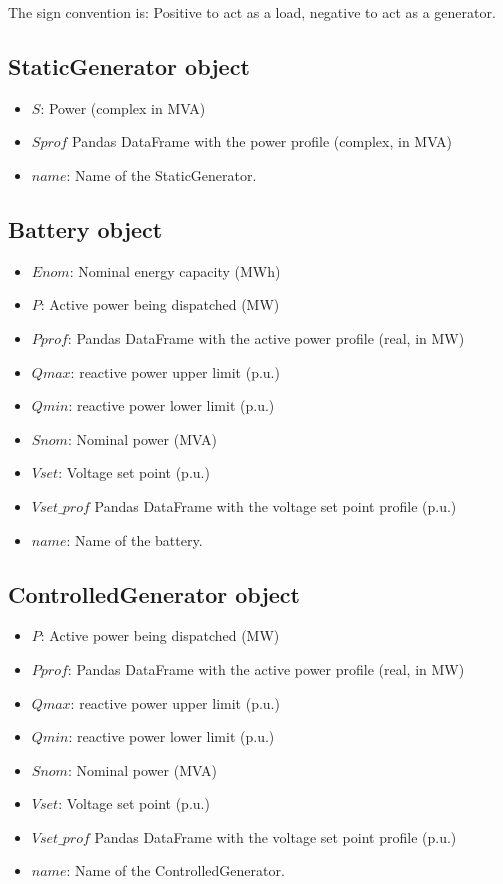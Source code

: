 \documentclass[11pt,fleqn]{book} %
\begin{document}
The sign convention is: Positive to act as a load, negative to act as a generator.

\subsection{StaticGenerator object}

\begin{itemize}
	\item $S$: Power (complex in MVA)
	\item $Sprof$ Pandas DataFrame with the power profile (complex, in MVA)
	\item $name$: Name of the StaticGenerator.
\end{itemize}




\subsection{Battery object}

\begin{itemize}
	\item $Enom$: Nominal energy capacity (MWh)
	\item $P$: Active power being dispatched (MW)
	\item $Pprof$: Pandas DataFrame with the active power profile (real, in MW)
	\item $Qmax$: reactive power upper limit (p.u.)
	\item $Qmin$: reactive power lower limit (p.u.)
	\item $Snom$: Nominal power (MVA)
	\item $Vset$: Voltage set point (p.u.)
	\item $Vset\_prof$ Pandas DataFrame with the voltage set point profile (p.u.)
	\item $name$: Name of the battery.
\end{itemize}



\subsection{ControlledGenerator object}

\begin{itemize}
	\item $P$: Active power being dispatched (MW)
	\item $Pprof$: Pandas DataFrame with the active power profile (real, in MW)
	\item $Qmax$: reactive power upper limit (p.u.)
	\item $Qmin$: reactive power lower limit (p.u.)
	\item $Snom$: Nominal power (MVA)
	\item $Vset$: Voltage set point (p.u.)
	\item $Vset\_prof$ Pandas DataFrame with the voltage set point profile (p.u.)
	\item $name$: Name of the ControlledGenerator.
\end{itemize}
\end{document}
